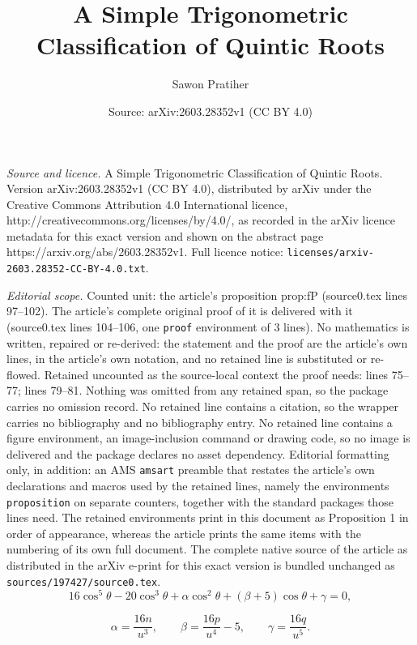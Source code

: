 \documentclass[10pt,a4paper]{amsart}
\title{A Simple Trigonometric Classification of Quintic Roots}
\author{Sawon Pratiher}
\date{Source: arXiv:2603.28352v1 (CC BY 4.0)}
\begin{document}
\maketitle

\noindent\emph{Source and licence.} A Simple Trigonometric Classification of Quintic Roots. Version arXiv:2603.28352v1 (CC BY 4.0), distributed by arXiv under the Creative Commons Attribution 4.0 International licence, http://creativecommons.org/licenses/by/4.0/, as recorded in the arXiv licence metadata for this exact version and shown on the abstract page https://arxiv.org/abs/2603.28352v1. Full licence notice: \texttt{licenses/arxiv-2603.28352-CC-BY-4.0.txt}.\par\smallskip

\noindent\textit{Editorial scope.} Counted unit: the article's proposition prop:fP (source0.tex lines 97--102). The article's complete original proof of it is delivered with it (source0.tex lines 104--106, one \texttt{proof} environment of 3 lines). No mathematics is written, repaired or re-derived: the statement and the proof are the article's own lines, in the article's own notation, and no retained line is substituted or re-flowed.  Retained uncounted as the source-local context the proof needs: lines 75--77; lines 79--81.  Nothing was omitted from any retained span, so the package carries no omission record.  No retained line contains a citation, so the wrapper carries no bibliography and no bibliography entry.  No retained line contains a figure environment, an image-inclusion command or drawing code, so no image is delivered and the package declares no asset dependency.  Editorial formatting only, in addition: an AMS \texttt{amsart} preamble that restates the article's own declarations and macros used by the retained lines, namely the environments \texttt{proposition} on separate counters, together with the standard packages those lines need.  The retained environments print in this document as Proposition 1 in order of appearance, whereas the article prints the same items with the numbering of its own full document.  The complete native source of the article as distributed in the arXiv e-print for this exact version is bundled unchanged as \texttt{sources/197427/source0.tex}.
\begin{equation}\label{eq:matched}
16\cos^5\theta - 20\cos^3\theta + \alpha\cos^2\theta + (\beta + 5)\cos\theta + \gamma = 0,
\end{equation}

\begin{equation}\label{eq:params}
\boxed{\alpha = \frac{16n}{u^3}, \qquad \beta = \frac{16p}{u^4} - 5, \qquad \gamma = \frac{16q}{u^5}.}
\end{equation}
\end{document}
